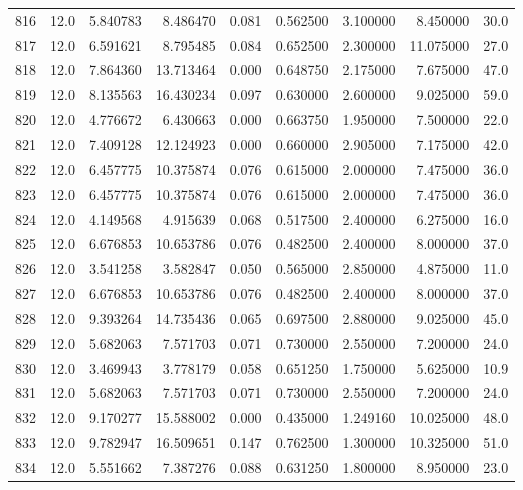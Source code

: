 \begin{tabular}{lrrrrrrrr}
816  &   12.0 &   5.840783 &   8.486470 &  0.081 &  0.562500 &  3.100000 &   8.450000 &   30.0 \\
817  &   12.0 &   6.591621 &   8.795485 &  0.084 &  0.652500 &  2.300000 &  11.075000 &   27.0 \\
818  &   12.0 &   7.864360 &  13.713464 &  0.000 &  0.648750 &  2.175000 &   7.675000 &   47.0 \\
819  &   12.0 &   8.135563 &  16.430234 &  0.097 &  0.630000 &  2.600000 &   9.025000 &   59.0 \\
820  &   12.0 &   4.776672 &   6.430663 &  0.000 &  0.663750 &  1.950000 &   7.500000 &   22.0 \\
821  &   12.0 &   7.409128 &  12.124923 &  0.000 &  0.660000 &  2.905000 &   7.175000 &   42.0 \\
822  &   12.0 &   6.457775 &  10.375874 &  0.076 &  0.615000 &  2.000000 &   7.475000 &   36.0 \\
823  &   12.0 &   6.457775 &  10.375874 &  0.076 &  0.615000 &  2.000000 &   7.475000 &   36.0 \\
824  &   12.0 &   4.149568 &   4.915639 &  0.068 &  0.517500 &  2.400000 &   6.275000 &   16.0 \\
825  &   12.0 &   6.676853 &  10.653786 &  0.076 &  0.482500 &  2.400000 &   8.000000 &   37.0 \\
826  &   12.0 &   3.541258 &   3.582847 &  0.050 &  0.565000 &  2.850000 &   4.875000 &   11.0 \\
827  &   12.0 &   6.676853 &  10.653786 &  0.076 &  0.482500 &  2.400000 &   8.000000 &   37.0 \\
828  &   12.0 &   9.393264 &  14.735436 &  0.065 &  0.697500 &  2.880000 &   9.025000 &   45.0 \\
829  &   12.0 &   5.682063 &   7.571703 &  0.071 &  0.730000 &  2.550000 &   7.200000 &   24.0 \\
830  &   12.0 &   3.469943 &   3.778179 &  0.058 &  0.651250 &  1.750000 &   5.625000 &   10.9 \\
831  &   12.0 &   5.682063 &   7.571703 &  0.071 &  0.730000 &  2.550000 &   7.200000 &   24.0 \\
832  &   12.0 &   9.170277 &  15.588002 &  0.000 &  0.435000 &  1.249160 &  10.025000 &   48.0 \\
833  &   12.0 &   9.782947 &  16.509651 &  0.147 &  0.762500 &  1.300000 &  10.325000 &   51.0 \\
834  &   12.0 &   5.551662 &   7.387276 &  0.088 &  0.631250 &  1.800000 &   8.950000 &   23.0 \\

\end{tabular}

